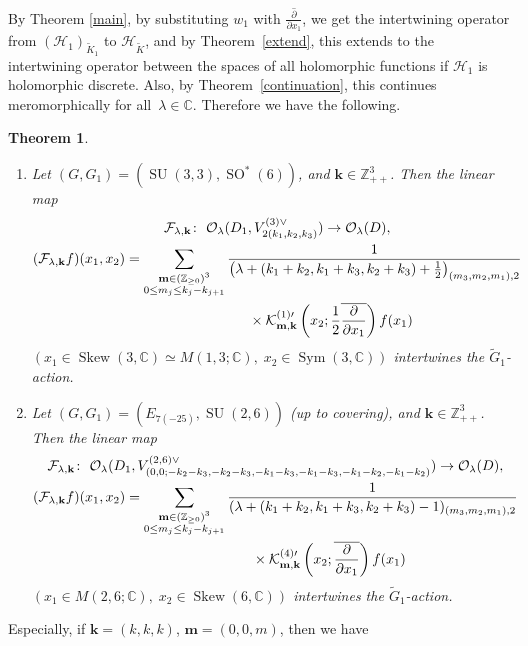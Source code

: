 \documentclass[pdftex]{sigma}
\numberwithin{equation}{section}
\newtheorem{Theorem}{Theorem}[section]
\newcommand{\bk}{\mathbf{k}}
\newcommand{\bm}{\mathbf{m}}
\newcommand{\BZ}{\mathbb{Z}}
\newcommand{\BC}{\mathbb{C}}
\newcommand{\cF}{\mathcal{F}}
\newcommand{\cH}{\mathcal{H}}
\newcommand{\cK}{\mathcal{K}}
\newcommand{\cO}{\mathcal{O}}
\newcommand{\Sym}{\operatorname{Sym}}
\newcommand{\Skew}{\operatorname{Skew}}
\begin{document}
By Theorem \ref{main}, by substituting $w_1$ with $\overline{\frac{\partial}{\partial x_1}}$, we get the intertwining operator from $(\cH_1)_{\tilde{K}_1}$ to $\cH_{\tilde{K}}$, and by Theorem~\ref{extend},
this extends to the intertwining operator between the spaces of all holomorphic functions if $\cH_1$ is holomorphic discrete. Also, by Theorem~\ref{continuation}, this continues meromorphically for all~$\lambda\in\BC$.
Therefore we have the following.
\begin{Theorem}\label{main3}\quad
\begin{enumerate}\itemsep=0pt
\item[$(1)$] Let $(G,G_1)=(\operatorname{SU}(3,3), \operatorname{SO}^*(6))$, and $\bk\in\BZ_{++}^3$.
Then the linear map
\begin{gather*}
\cF_{\lambda,\bk}\colon \ \cO_\lambda(D_1,V_{2(k_1,k_2,k_3)}^{(3)\vee})\to \cO_\lambda(D), \\
(\cF_{\lambda,\bk}f)(x_1,x_2)=\sum_{\substack{\bm\in(\BZ_{\ge 0})^3\\ 0\le m_j\le k_j-k_{j+1}}}
\frac{1}{\left(\lambda+(k_1+k_2,k_1+k_3,k_2+k_3)+\frac{1}{2}\right)_{(m_3,m_2,m_1),2}}\\
\hphantom{(\cF_{\lambda,\bk}f)(x_1,x_2)=}{} \times \cK_{\bm,\bk}^{(1)\prime}\left(x_2;\frac{1}{2}\overline{\frac{\partial}{\partial x_1}}\right)f(x_1)
\end{gather*}
$(x_1\in \Skew(3,\BC)\simeq M(1,3;\BC),\; x_2\in\Sym(3,\BC))$ intertwines the $\tilde{G}_1$-action.
\item[$(2)$] Let $(G,G_1)=(E_{7(-25)}, \operatorname{SU}(2,6))$ (up to covering), and $\bk\in\BZ_{++}^3$.
Then the linear map
\begin{gather*}
\cF_{\lambda,\bk}\colon \ \cO_\lambda(D_1,V_{(0,0;-k_2-k_3,-k_2-k_3,-k_1-k_3,-k_1-k_3,-k_1-k_2,-k_1-k_2)}^{(2,6)\vee})
\to \cO_\lambda(D), \\
(\cF_{\lambda,\bk}f)(x_1,x_2)=\sum_{\substack{\bm\in(\BZ_{\ge 0})^3\\ 0\le m_j\le k_j-k_{j+1}}}
\frac{1}{(\lambda+(k_1+k_2,k_1+k_3,k_2+k_3)-1)_{(m_3,m_2,m_1),2}}\\
\hphantom{(\cF_{\lambda,\bk}f)(x_1,x_2)=}{} \times \cK_{\bm,\bk}^{(4)\prime}\left(x_2;\overline{\frac{\partial}{\partial x_1}}\right)f(x_1)
\end{gather*}
$(x_1\in M(2,6;\BC),\; x_2\in\Skew(6,\BC))$ intertwines the $\tilde{G}_1$-action.
\end{enumerate}
\end{Theorem}
Especially, if $\bk=(k,k,k)$, $\bm=(0,0,m)$, then we have
\end{document}
